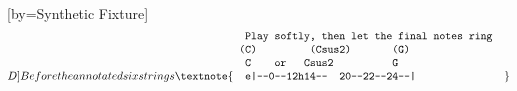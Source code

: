 \documentclass[12pt]{article}
\begin{document}
\begin{songs}{}
[by={Synthetic Fixture}]
\beginverse
\[D]Before the annotated six strings
\textnote{\vbox{\fontencoding{OT1}\fontfamily{cmtt}\fontsize{10}{12}\selectfont
\setbox0=\hbox{\char48\relax}\dimen0=\wd0\relax
\hbox{\hskip\dimen0\relax \hskip\dimen0\relax \char80\relax \char108\relax \char97\relax \char121\relax \hskip\dimen0\relax \char115\relax \char111\relax \char102\relax \char116\relax \char108\relax \char121\relax \char44\relax \hskip\dimen0\relax \char116\relax \char104\relax \char101\relax \char110\relax \hskip\dimen0\relax \char108\relax \char101\relax \char116\relax \hskip\dimen0\relax \char116\relax \char104\relax \char101\relax \hskip\dimen0\relax \char102\relax \char105\relax \char110\relax \char97\relax \char108\relax \hskip\dimen0\relax \char110\relax \char111\relax \char116\relax \char101\relax \char115\relax \hskip\dimen0\relax \char114\relax \char105\relax \char110\relax \char103\relax \hskip\dimen0\relax \hskip\dimen0\relax }
\hbox{\hskip\dimen0\relax \char40\relax \char67\relax \char41\relax \hskip\dimen0\relax \hskip\dimen0\relax \hskip\dimen0\relax \hskip\dimen0\relax \hskip\dimen0\relax \hskip\dimen0\relax \hskip\dimen0\relax \hskip\dimen0\relax \hskip\dimen0\relax \char40\relax \char67\relax \char115\relax \char117\relax \char115\relax \char50\relax \char41\relax \hskip\dimen0\relax \hskip\dimen0\relax \hskip\dimen0\relax \hskip\dimen0\relax \hskip\dimen0\relax \hskip\dimen0\relax \hskip\dimen0\relax \char40\relax \char71\relax \char41\relax \hskip\dimen0\relax \hskip\dimen0\relax }
\hbox{\hskip\dimen0\relax \hskip\dimen0\relax \char67\relax \hskip\dimen0\relax \hskip\dimen0\relax \hskip\dimen0\relax \hskip\dimen0\relax \char111\relax \char114\relax \hskip\dimen0\relax \hskip\dimen0\relax \hskip\dimen0\relax \char67\relax \char115\relax \char117\relax \char115\relax \char50\relax \hskip\dimen0\relax \hskip\dimen0\relax \hskip\dimen0\relax \hskip\dimen0\relax \hskip\dimen0\relax \hskip\dimen0\relax \hskip\dimen0\relax \hskip\dimen0\relax \hskip\dimen0\relax \hskip\dimen0\relax \char71\relax \hskip\dimen0\relax \hskip\dimen0\relax }
\hbox{\hskip\dimen0\relax \hskip\dimen0\relax \char101\relax \char124\relax \char45\relax \char45\relax \char48\relax \char45\relax \char45\relax \char49\relax \char50\relax \char104\relax \char49\relax \char52\relax \char45\relax \char45\relax \hskip\dimen0\relax \hskip\dimen0\relax \char50\relax \char48\relax \char45\relax \char45\relax \char50\relax \char50\relax \char45\relax \char45\relax \char50\relax \char52\relax \char45\relax \char45\relax \char124\relax \hskip\dimen0\relax \hskip\dimen0\relax }
}}\]
\end{songs}
\end{document}
